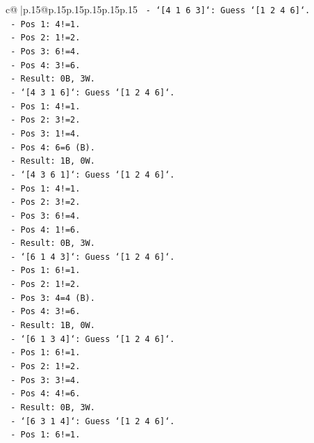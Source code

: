 \documentclass{article}
\begin{document}
{\begin{supertabular}{c@{$\;$}|p{.15\linewidth}@{}p{.15\linewidth}p{.15\linewidth}p{.15\linewidth}p{.15\linewidth}p{.15\linewidth}}
{{{\texttt{    {-} `{[}4 1 6 3{]}`: Guess `{[}1 2 4 6{]}`.} \\
\texttt{        {-} Pos 1: 4!=1.} \\
\texttt{        {-} Pos 2: 1!=2.} \\
\texttt{        {-} Pos 3: 6!=4.} \\
\texttt{        {-} Pos 4: 3!=6.} \\
\texttt{        {-} Result: 0B, 3W.} \\
\texttt{    {-} `{[}4 3 1 6{]}`: Guess `{[}1 2 4 6{]}`.} \\
\texttt{        {-} Pos 1: 4!=1.} \\
\texttt{        {-} Pos 2: 3!=2.} \\
\texttt{        {-} Pos 3: 1!=4.} \\
\texttt{        {-} Pos 4: 6=6 (B).} \\
\texttt{        {-} Result: 1B, 0W.} \\
\texttt{    {-} `{[}4 3 6 1{]}`: Guess `{[}1 2 4 6{]}`.} \\
\texttt{        {-} Pos 1: 4!=1.} \\
\texttt{        {-} Pos 2: 3!=2.} \\
\texttt{        {-} Pos 3: 6!=4.} \\
\texttt{        {-} Pos 4: 1!=6.} \\
\texttt{        {-} Result: 0B, 3W.} \\
\texttt{    {-} `{[}6 1 4 3{]}`: Guess `{[}1 2 4 6{]}`.} \\
\texttt{        {-} Pos 1: 6!=1.} \\
\texttt{        {-} Pos 2: 1!=2.} \\
\texttt{        {-} Pos 3: 4=4 (B).} \\
\texttt{        {-} Pos 4: 3!=6.} \\
\texttt{        {-} Result: 1B, 0W.} \\
\texttt{    {-} `{[}6 1 3 4{]}`: Guess `{[}1 2 4 6{]}`.} \\
\texttt{        {-} Pos 1: 6!=1.} \\
\texttt{        {-} Pos 2: 1!=2.} \\
\texttt{        {-} Pos 3: 3!=4.} \\
\texttt{        {-} Pos 4: 4!=6.} \\
\texttt{        {-} Result: 0B, 3W.} \\
\texttt{    {-} `{[}6 3 1 4{]}`: Guess `{[}1 2 4 6{]}`.} \\
\texttt{        {-} Pos 1: 6!=1.} \\
}}}
\end{supertabular}}
\end{document}
